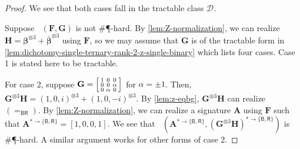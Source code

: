 \documentclass[11pt]{article}
\DeclareMathOperator{\holbs}{Holant^*_2}
\DeclareMathOperator{\holts}{Holant^*_3}
\newcommand{\db}{\mathsf{B}}
\newcommand{\dr}{\mathsf{R}}
\newcommand{\sph}{\#\P-hard\xspace}
\newcommand{\teh}{^{\otimes 3}}
\newcommand{\domres}[1]{
  ^{*\to\{#1\}}
}
\newcommand{\tractBGR}{$\mathscr{D}$\xspace}
\begin{document}
\begin{proof}
We see that both cases fall in the tractable class \tractBGR.

Suppose $\holts(\mathbf{F}, \mathbf{G})$ is not \sph.
  By \cref{lem:Z-normalization}, we can realize $\mathbf{H} = \boldsymbol{\beta}\teh + \overline{\boldsymbol{\beta}}\teh$ using $\mathbf{F}$, so we may assume that $\mathbf{G}$ is of the tractable form in \cref{lem:dichotomy-single-ternary-rank-2-z-single-binary} which lists four cases. Case 1 is 
  stated here to be tractable.



  For case 2, suppose $\mathbf{G} = \begin{bsmallmatrix}
    1 & 0 & 0 \\
    0 & 0 & \alpha \\
    0 & \alpha & 0
  \end{bsmallmatrix}$ for $\alpha = \pm 1$.
  Then, $\mathbf{G}\teh \mathbf{H} = (1, 0, i)\teh + (1, 0, -i)\teh$.
  By \cref{lem:z-eqbg}, $\mathbf{G}\teh \mathbf{H}$ can realize $(=_{\db \dr})$.
  By \cref{lem:Z-normalization}, we can realize a signature $\mathbf{A}$ using $\mathbf{F}$ such that $\mathbf{A}\domres{\db, \dr} = [1, 0, 0, 1]$.
  We see that $\holbs(\mathbf{A}\domres{\db, \dr}, (\mathbf{G}\teh \mathbf{H})\domres{\db, \dr})$ is \sph. 
  A similar argument works for other forms of case 2.


\end{proof}
\end{document}

